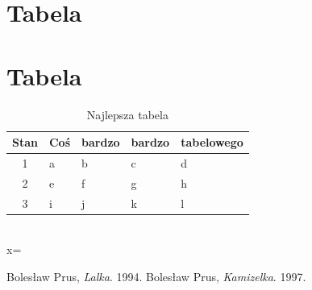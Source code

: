 \documentclass[11pt]{article}
\begin{document}
\newpage
\part{Tabela}
\part{Tabela}
\begin{table}[h]
\caption{Najlepsza tabela}
\label{tab:tabela}
\begin{center}
\begin{tabular}{|c||l|l|l|l|}
\hline Stan & Coś & bardzo & bardzo & tabelowego \\ \hline \hline
1 & a & b & c & d \\
2 & e & f & g & h \\
3 & i & j & k & l \\ \hline
\end{tabular}
\end{center}
\end{table}
\\
x=\left[ \begin{array}{cccc}
1 & 2  & 3 \\
4} & 5  & 6 \\
\vdots  & \ddots & \vdots \\
7 & 8  & 9
\end{array} \right]

\newpage
\begin{thebibliography}{9}
Bolesław Prus,
\emph{Lalka}.
1994.
Bolesław Prus,
\emph{Kamizelka}.
1997.
\end{thebibliography}
\end{document}
